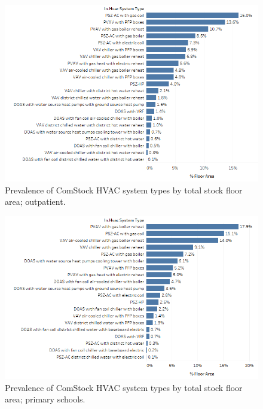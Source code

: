 \begin{figure}
    \centering \includegraphics[width=1.0\textwidth]{figures/HVAC_SYS_Type_PREV_Outpatient.png}
    \caption[HVAC system type prevalence in outpatient]{Prevalence of ComStock HVAC system types by total stock floor area; outpatient.}
    \label{fig:hvac_sys_type_prevalence_outpatient}
\end{figure}

\begin{figure}
    \centering \includegraphics[width=1.0\textwidth]{figures/HVAC_SYS_Type_PREV_Primary_School.png}
    \caption[HVAC system type prevalence in primary schools]{Prevalence of ComStock HVAC system types by total stock floor area; primary schools.}
    \label{fig:hvac_sys_type_prevalence_primary_school}
\end{figure}

